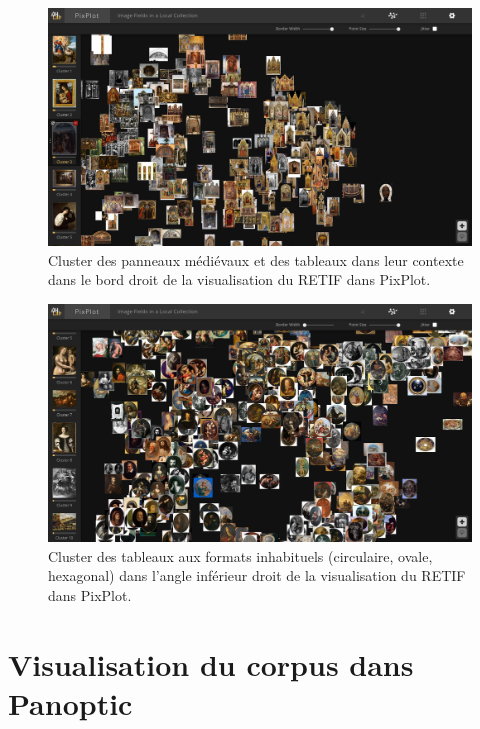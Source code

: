 \begin{figure}[H]
    \centering
    \includegraphics[width=1\textwidth]{annexes/figures/PP-polyptiques.png}
    \caption{Cluster des panneaux médiévaux et des tableaux dans leur contexte dans le bord droit  de la visualisation du RETIF dans PixPlot.}
    \label{fig:PP-polyptiques}
\end{figure}

\begin{figure}[H]
    \centering
    \includegraphics[width=1\textwidth]{annexes/figures/PP-ronds.png}
    \caption{Cluster des tableaux aux formats inhabituels (circulaire, ovale, hexagonal) dans l'angle inférieur droit de la visualisation du RETIF dans PixPlot.}
    \label{fig:PP-ronds}
\end{figure}

\section{Visualisation du corpus dans Panoptic}

